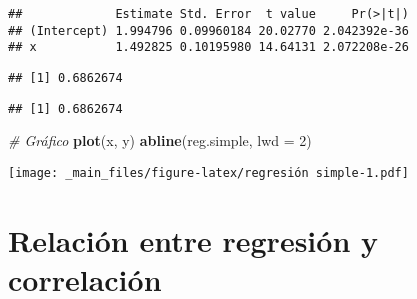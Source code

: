 \documentclass[
]{book}
\newenvironment{Shaded}{\begin{snugshade}}{\end{snugshade}}
\newcommand{\CommentTok}[1]{\textcolor[rgb]{0.56,0.35,0.01}{\textit{#1}}}
\newcommand{\DataTypeTok}[1]{\textcolor[rgb]{0.13,0.29,0.53}{#1}}
\newcommand{\DecValTok}[1]{\textcolor[rgb]{0.00,0.00,0.81}{#1}}
\newcommand{\KeywordTok}[1]{\textcolor[rgb]{0.13,0.29,0.53}{\textbf{#1}}}
\newcommand{\NormalTok}[1]{#1}
\newcommand{\OperatorTok}[1]{\textcolor[rgb]{0.81,0.36,0.00}{\textbf{#1}}}
\newcommand{\StringTok}[1]{\textcolor[rgb]{0.31,0.60,0.02}{#1}}
\begin{document}
\begin{verbatim}
##             Estimate Std. Error  t value     Pr(>|t|)
## (Intercept) 1.994796 0.09960184 20.02770 2.042392e-36
## x           1.492825 0.10195980 14.64131 2.072208e-26
\end{verbatim}

\begin{Shaded}
\end{Shaded}

\begin{verbatim}
## [1] 0.6862674
\end{verbatim}

\begin{Shaded}
\end{Shaded}

\begin{verbatim}
## [1] 0.6862674
\end{verbatim}

\begin{Shaded}
\begin{Highlighting}[]
\CommentTok{# Gráfico}
\KeywordTok{plot}\NormalTok{(x, y)}
\KeywordTok{abline}\NormalTok{(reg.simple, }\DataTypeTok{lwd =} \DecValTok{2}\NormalTok{)}
\end{Highlighting}
\end{Shaded}

\texttt{[image: \_main\_files/figure-latex/regresión simple-1.pdf]}

\hypertarget{relaciuxf3n-entre-regresiuxf3n-y-correlaciuxf3n}{%
\section{Relación entre regresión y correlación}\label{relaciuxf3n-entre-regresiuxf3n-y-correlaciuxf3n}}
\end{document}
